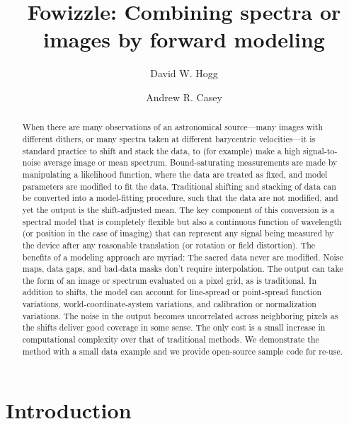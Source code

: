 \documentclass[modern]{aastex631}
\begin{document}
\title{\large Fowizzle: Combining spectra or images by forward modeling}

\author[0000-0003-2866-9403]{David W. Hogg}

\author[0000-0003-0174-0564]{Andrew R. Casey}

\begin{abstract}\noindent
When there are many observations of an astronomical source---many images with different dithers, or many spectra taken at different barycentric velocities---it is standard practice to shift and stack the data, to (for example) make a high signal-to-noise average image or mean spectrum.
Bound-saturating measurements are made by manipulating a likelihood function, where the data are treated as fixed, and model parameters are modified to fit the data.
Traditional shifting and stacking of data can be converted into a model-fitting procedure, such that the data are not modified, and yet the output is the shift-adjusted mean.
The key component of this conversion is a spectral model that is completely flexible but also a continuous function of wavelength (or position in the case of imaging) that can represent any signal being measured by the device after any reasonable translation (or rotation or field distortion).
The benefits of a modeling approach are myriad:
The sacred data never are modified.
Noise maps, data gaps, and bad-data masks don't require interpolation.
The output can take the form of an image or spectrum evaluated on a pixel grid, as is traditional.
In addition to shifts, the model can account for line-spread or point-spread function variations, world-coordinate-system variations, and calibration or normalization variations.
The noise in the output becomes uncorrelated across neighboring pixels as the shifts deliver good coverage in some sense.
The only cost is a small increase in computational complexity over that of traditional methods.
We demonstrate the method with a small data example and we provide open-source sample code for re-use.
\end{abstract}


\section{Introduction}\label{sec:intro}
\end{document}
